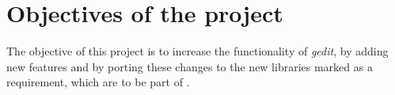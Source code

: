 \chapter{Objectives of the project}

The objective of this project is to increase the functionality of \emph{gedit}, by adding new features and by porting these changes to the new libraries marked as a requirement, which are to be part of .



